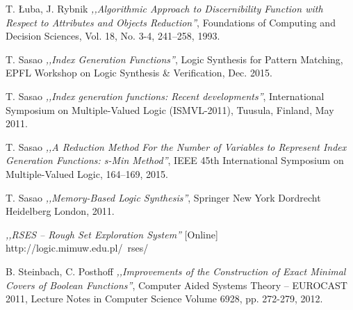 \begin{thebibliography}{99}
 T. Łuba, J. Rybnik \emph{,,Algorithmic Approach to Discernibility Function with Respect to Attributes and Objects Reduction''}, Foundations of Computing and Decision Sciences, Vol. 18, No. 3-4, 241–258, 1993.

 T. Sasao \emph{,,Index Generation Functions''}, Logic Synthesis for Pattern Matching, EPFL Workshop on Logic Synthesis \& Verification, Dec. 2015.

 T. Sasao \emph{,,Index generation functions: Recent developments''}, International Symposium on Multiple-Valued Logic (ISMVL-2011), Tuusula, Finland, May 2011.

 T. Sasao \emph{,,A Reduction Method For the Number of Variables to Represent Index Generation Functions: s-Min Method''}, IEEE 45th International Symposium on Multiple-Valued Logic, 164–169, 2015.

 T. Sasao \emph{,,Memory-Based Logic Synthesis''}, Springer New York Dordrecht Heidelberg London, 2011.

 \emph{,,RSES – Rough Set Exploration System''} [Online] http://logic.mimuw.edu.pl/~rses/

 B. Steinbach, C. Posthoff \emph{,,Improvements of the Construction of Exact Minimal Covers of Boolean Functions''}, Computer Aided Systems Theory – EUROCAST 2011, Lecture Notes in Computer Science Volume 6928, pp. 272-279, 2012.


\end{thebibliography}

